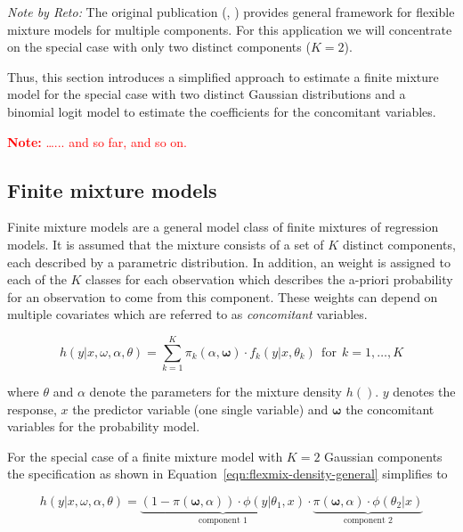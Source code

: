 \documentclass[article,nojss,shortnames]{jss}
\newcommand{\note}[1]{\textcolor{red}{\textbf{Note:} #1}}
\begin{document}
\textit{Note by Reto:}
The original publication (, \citealt{gruen2008})
provides general framework for flexible mixture models for multiple
components. For this application we will concentrate on the special
case with only two distinct components ($K = 2$).

Thus, this section introduces a simplified approach to estimate 
a finite mixture model for the special case with two distinct
Gaussian distributions and a binomial logit model to estimate
the coefficients for the concomitant variables.

\note{\dots ... and so far, and so on.}

\subsection{Finite mixture models}

Finite mixture models are a general model class of finite
mixtures of regression models. It is assumed that the mixture
consists of a set of $K$ distinct components, each described by
a parametric distribution.
In addition, an weight is assigned to each of the $K$ classes
for each observation which describes the a-priori probability
for an observation to come from this component.
These weights can depend on multiple covariates which are
referred to as \textit{concomitant} variables.

\begin{equation}
    h(\mathit{y} | \mathit{x}, \mathit{\omega}, \mathit{\alpha}, \mathit{\theta}) =
        \sum_{k=1}^K \pi_k(\mathit{\alpha}, \mathbf{\omega}) \cdot f_k(\mathit{y} | \mathit{x}, \mathit{\theta}_k)
        ~~\text{for}~~k=1,\dots,K
    \label{eqn:flexmix-density-general}
\end{equation}

where $\mathit{\theta}$ and $\mathit{\alpha}$ denote the parameters for the
mixture density $h()$. $\mathit{y}$ denotes the response, $\mathit{x}$ the
predictor variable (one single variable) and $\mathbf{\omega}$ the concomitant
variables for the probability model.

For the special case of a finite mixture model with $K=2$ Gaussian components
the specification as shown in Equation~\ref{eqn:flexmix-density-general} simplifies to

\begin{equation}
    h(\mathit{y} | \mathit{x}, \mathit{\omega}, \mathit{\alpha}, \mathit{\theta}) =
        \underbrace{
            (1 - \mathit{\pi}(\mathbf{\omega}, \mathit{\alpha})) \cdot
            \phi(\mathit{y} | \mathit{\theta}_1, \mathit{x})
        }_{\text{component 1}}
        \cdot
        \underbrace{
            \mathit{\pi}(\mathbf{\omega}, \mathit{\alpha}) \cdot \phi(\mathit{\theta}_2|\mathit{x})
        }_{\text{component 2}}
    \label{eqn:flexmix-density-gaussian}
\end{equation}
\end{document}
